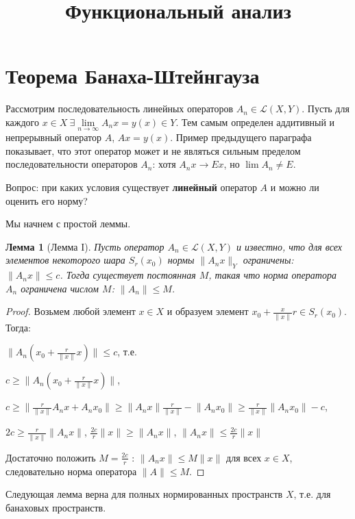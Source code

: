 \documentclass[12pt,a4paper,titlepage]{book}
\title{Функциональный анализ}
\theoremstyle{definition}
\theoremstyle{plain}
\theoremstyle{remark}
\theoremstyle{plain}
\newtheorem{lemma}{Лемма}
\begin{document}
\section{Теорема Банаха-Штейнгауза}
Рассмотрим последовательность линейных операторов $A_n \in \mathcal{L}(X,Y)$. Пусть для каждого $x \in X\ \exists \lim\limits_{n\to \infty}A_n x = y(x) \in Y$. Тем самым определен аддитивный и непрерывный оператор $A$, $Ax = y(x)$. Пример предыдущего параграфа показывает, что этот оператор может и не являться сильным пределом последовательности операторов $A_n$: хотя $A_n x \to E x$, но $\lim A_n \ne E$.

Вопрос: при каких условия существует \textbf{линейный} оператор $A$ и можно ли оценить его норму?

Мы начнем с простой леммы.

\begin{lemma}[Лемма I]
Пусть оператор $A_n \in \mathcal{L}(X,Y)$ и известно, что для всех элементов некоторого шара $S_r(x_0)$ нормы $\lVert A_n x\rVert_Y$ ограничены: $\lVert A_n x\rVert \le c$. Тогда существует постоянная $M$, такая что норма оператора $A_n$ ограничена числом $M$: $\lVert A_n \rVert \le M$.
\end{lemma}

\begin{proof}
Возьмем любой элемент $x \in X$ и образуем элемент $x_0+\frac{x}{\lVert x\rVert}r \in S_r(x_0)$. Тогда:

\begin{center}
$\lVert A_n(x_0+\frac{r}{\lVert x\rVert}x)\rVert \le c$, т.е.

$c \ge \lVert A_n(x_0+\frac{r}{\lVert x\rVert}x)\rVert$,

$c \ge \lVert \frac{r}{\lVert x\rVert}A_n x + A_n x_0 \rVert \ge \lVert A_n x\rVert \frac{r}{\lVert x\rVert} - \lVert A_n x_0\rVert \ge \frac{r}{\lVert x\rVert}\lVert A_n x_0\rVert - c$,

$2c \ge \frac{r}{\lVert x\rVert}\lVert A_n x\rVert$, $\frac{2c}{r}\lVert x\rVert \ge \lVert A_n x\rVert$, $\lVert A_n x\rVert \le \frac{2c}{r}\lVert x\rVert$
\end{center}

Достаточно положить $M=\frac{2c}{r}$ : $\lVert A_n x\rVert \le M\lVert x\rVert$ для всех $x \in X$, следовательно норма оператора $\lVert A\rVert \le M$.
\end{proof}

Следующая лемма верна для полных нормированных пространств $X$, т.е. для банаховых пространств.
\end{document}
